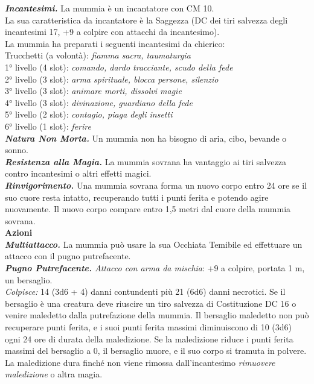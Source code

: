 \begin{multicols}{2}
\emph{\textbf{Incantesimi.}} La mummia è un incantatore con CM 10.\\
La sua caratteristica da incantatore è la Saggezza (DC dei tiri salvezza degli incantesimi 17, +9 a colpire con attacchi da incantesimo).\\
La mummia ha preparati i seguenti incantesimi da chierico:\\
Trucchetti (a volontà): \emph{fiamma sacra, taumaturgia}\\
1° livello (4 slot): \emph{comando, dardo tracciante, scudo della fede}\\
2° livello (3 slot): \emph{arma spirituale, blocca persone, silenzio}\\
3° livello (3 slot): \emph{animare morti, dissolvi magie}\\
4° livello (3 slot): \emph{divinazione, guardiano della fede}\\
5° livello (2 slot): \emph{contagio, piaga degli insetti}\\
6° livello (1 slot): \emph{ferire}\\
\emph{\textbf{Natura Non Morta.}} Un mummia non ha bisogno di aria, cibo, bevande o sonno.\\
\emph{\textbf{Resistenza alla Magia.}} La mummia sovrana ha vantaggio ai tiri salvezza contro incantesimi o altri effetti magici.\\
\emph{\textbf{Rinvigorimento.}} Una mummia sovrana forma un nuovo corpo entro 24 ore se il suo cuore resta intatto, recuperando tutti i punti ferita e potendo agire nuovamente. Il nuovo corpo compare entro 1,5 metri dal cuore della mummia sovrana.\\
\smallskip\textbf{Azioni}\\
\emph{\textbf{Multiattacco.}} La mummia può usare la sua Occhiata Temibile ed effettuare un attacco con il pugno putrefacente.\\
\emph{\textbf{Pugno Putrefacente.} Attacco con arma da mischia}: +9 a colpire, portata 1 m, un bersaglio.\\
\emph{Colpisce:} 14 (3d6 + 4) danni contundenti più 21 (6d6) danni necrotici. Se il bersaglio è una creatura deve riuscire un tiro salvezza di Costituzione DC 16 o venire maledetto dalla putrefazione della mummia. Il bersaglio maledetto non può recuperare punti ferita, e i suoi punti ferita massimi diminuiscono di 10 (3d6) ogni 24 ore di durata della maledizione. Se la maledizione riduce i punti ferita massimi del bersaglio a 0, il bersaglio muore, e il suo corpo si tramuta in polvere. La maledizione dura finché non viene rimossa dall'incantesimo \emph{rimuovere maledizione} o altra magia.\\


\end{multicols}
